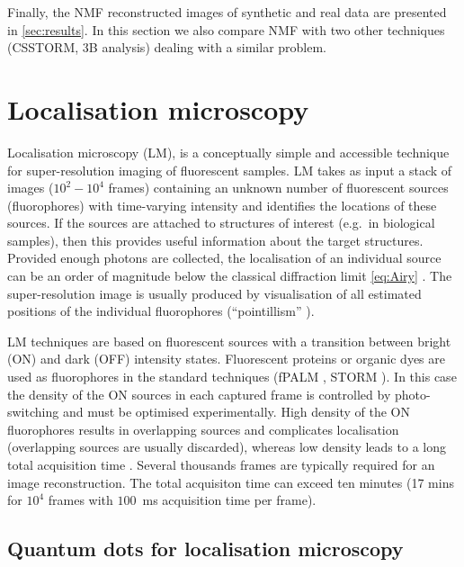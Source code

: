 Finally, the NMF reconstructed images of synthetic and real data are presented in \autoref{sec:results}. In this section we also compare NMF with two other techniques (CSSTORM, 3B analysis) dealing with a similar problem. 


\section{Localisation microscopy\label{sec:LM}}

Localisation microscopy (LM), is a conceptually simple and accessible technique for super-resolution imaging of fluorescent samples. LM takes as input a stack of images ($10^2-10^4$ frames) containing an unknown number of fluorescent sources (fluorophores) with time-varying intensity and identifies the locations of these sources. If the sources are attached to structures of interest (e.g.\ in biological samples), then this provides useful information about the target structures. Provided enough photons are collected, the localisation of an individual source can be an order of magnitude below the classical diffraction limit \autoref{eq:Airy} \cite{Ober2004}. The super-resolution image is usually produced by visualisation of all estimated positions of the individual fluorophores (``pointillism'' \cite{Lidke2005}). 

LM techniques are based on fluorescent sources with a transition between bright (ON) and dark (OFF) intensity states. Fluorescent proteins or organic dyes are used as fluorophores in the standard techniques (fPALM \cite{Hess2006}, STORM \cite{Rust2006}). In this case the density of the ON sources in each captured frame is controlled by photo-switching and must be optimised experimentally. High density of the ON fluorophores results in overlapping sources and complicates localisation (overlapping sources are usually discarded), whereas low density leads to a long total acquisition time \cite{Small2009}. Several thousands frames are typically required for an image reconstruction. The total acquisiton time can exceed ten minutes (17 mins for $10^4$ frames with $100$~ms acquisition time per frame). 


\subsection{Quantum dots for localisation microscopy\label{sec:QD for LM}}

